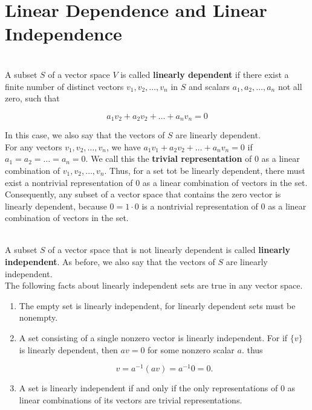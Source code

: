 \section{Linear Dependence and Linear Independence}

\begin{definition}
	\hfill\\
	A subset $S$ of a vector space $V$ is called \textbf{linearly dependent} if there exist a finite number of distinct vectors $v_1, v_2, \dots, v_n$ in $S$ and scalars $a_1, a_2, \dots, a_n$ not all zero, such that
	
	\[a_1v_2 + a_2v_2 + \dots + a_nv_n = 0\]
	
	In this case, we also say that the vectors of $S$ are linearly dependent.\\

	For any vectors $v_1, v_2, \dots, v_n$, we have $a_1v_1 + a_2v_2 + \dots + a_nv_n = 0$ if $a_1 = a_2 = \dots = a_n = 0$. We call this the \textbf{trivial representation} of $0$ as a linear combination of $v_1, v_2, \dots, v_n$. Thus, for a set tot be linearly dependent, there must exist a nontrivial representation of $0$ as a linear combination of vectors in the set. Consequently, any subset of a vector space that contains the zero vector is linearly dependent, because $0 = 1 \cdot 0$ is a nontrivial representation of $0$ as a linear combination of vectors in the set.
\end{definition}

\begin{definition}
	\hfill\\
	A subset $S$ of a vector space that is not linearly dependent is called \textbf{linearly independent}. As before, we also say that the vectors of $S$ are linearly independent.\\
	
	The following facts about linearly independent sets are true in any vector space.
	
	\begin{enumerate}
		\item The empty set is linearly independent, for linearly dependent sets must be nonempty.
		\item A set consisting of a single nonzero vector is linearly independent. For if $\{v\}$ is linearly dependent, then $av = 0$ for some nonzero scalar $a$. thus
		
		\[v = a^{-1}(av) = a^{-1}0 = 0.\]
		
		\item A set is linearly independent if and only if the only representations of $0$ as linear combinations of its vectors are trivial representations.
	\end{enumerate}
\end{definition}

